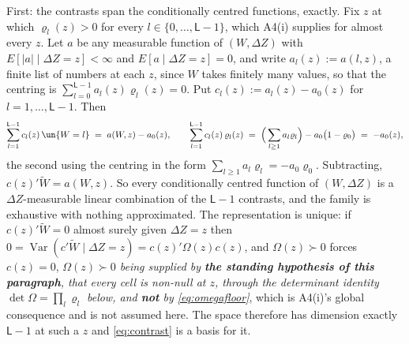 First: the contrasts span the conditionally centred functions, exactly. Fix $z$ at which
$\varrho_l(z)>0$ for every $l\in\{0,\dots,\mathsf L-1\}$, which A4(i) supplies for almost every $z$. Let
$a$ be any measurable function of $(W,\Delta Z)$ with $E[|a|\mid\Delta Z=z]<\infty$ and
$E[a\mid\Delta Z=z]=0$, and write $a_l(z):=a(l,z)$, a finite list of numbers at each $z$, since $W$
takes finitely many values, so that
the centring is $\sum_{l=0}^{\mathsf L-1}a_l(z)\varrho_l(z)=0$. Put $c_l(z):=a_l(z)-a_0(z)$ for
$l=1,\dots,\mathsf L-1$. Then
\[
\sum_{l=1}^{\mathsf L-1}c_l(z)\,\un\{W=l\}
\;=\;a(W,z)-a_0(z),
\qquad
\sum_{l=1}^{\mathsf L-1}c_l(z)\,\varrho_l(z)
\;=\;\Big(\sum_{l\ge1}a_l\varrho_l\Big)-a_0\big(1-\varrho_0\big)
\;=\;-a_0(z),
\]
the second using the centring in the form $\sum_{l\ge1}a_l\varrho_l=-a_0\varrho_0$. Subtracting,
$c(z)'\widetilde W=a(W,z)$. So every conditionally centred function of $(W,\Delta Z)$ is a
$\Delta Z$-measurable linear combination of the $\mathsf L-1$ contrasts, and the family is exhaustive
with nothing approximated. The representation is unique: if $c(z)'\widetilde W=0$ almost surely given
$\Delta Z=z$ then $0=\operatorname{Var}(c'\widetilde W\mid\Delta Z=z)=c(z)'\Omega(z)c(z)$, and
$\Omega(z)\succ0$ forces $c(z)=0$, \emph{$\Omega(z)\succ0$ being supplied by \textbf{the standing
hypothesis of this paragraph}, that every cell is non-null at $z$, through the determinant identity
$\det\Omega=\prod_{l}\varrho_l$ below, and \textbf{not} by \eqref{eq:omegafloor}}, which is A4(i)'s
global consequence and is not assumed here. The space therefore has dimension
exactly $\mathsf L-1$ at such a $z$ and \eqref{eq:contrast} is a basis for it.

